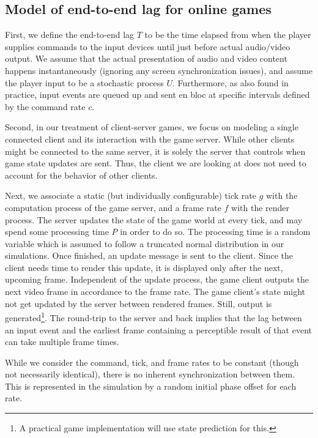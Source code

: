 \subsection{Model of end-to-end lag for online games}
First, we define the end-to-end lag $T$ to be the time elapsed 
from when the player supplies commands to the input devices until just 
before actual audio/video output.
We assume that the actual presentation of 
audio and video content happens instantaneously  
(ignoring any screen synchronization issues), and assume the player 
input to be a stochastic process $U$. %
Furthermore, as also found in practice, input events are queued up  
and sent en bloc at specific intervals defined by the command rate $c$.

Second, in our treatment of client-server games, we focus on modeling 
a single connected client and its interaction with the game server. 
While other clients might be connected to the same server, it is 
solely the server that controls when game state updates are sent. 
Thus, the client we are looking at does not need to account for the 
behavior of other clients.

Next, we associate a static (but individually configurable) tick 
rate $g$ with the computation process of the game server, and a frame rate $f$
with the render process. 
The server updates the state of the game world at every tick, and may 
spend some processing time $P$ in order to do so. The processing time is a random variable which is assumed to follow a truncated normal distribution in our simulations. Once finished, an update 
message is sent to the client. Since the client needs time to render 
this update, it is displayed only after the next, upcoming frame.
Independent of the update process, the game client outputs the next 
video frame in accordance to the frame rate. The game client's state 
might not get updated by the server between rendered frames. Still, 
output is generated\footnote{A practical game implementation will use state prediction for this.}.
The round-trip to the server and back implies that
the lag between an input event and the earliest frame containing a perceptible 
result of that event can take multiple frame times.

While we consider the command, tick, and frame rates to be constant 
(though not necessarily identical), there is no inherent synchronization 
between them. This is represented in the simulation by a random initial 
phase offset for each rate.

